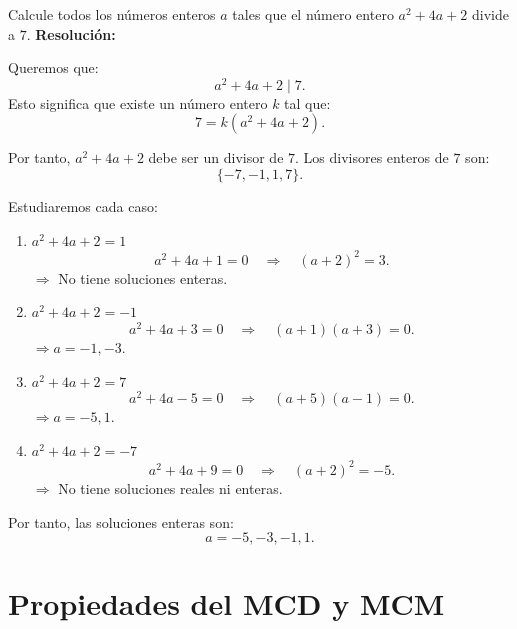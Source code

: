 \documentclass[a4paper,12pt]{article}
\begin{document}
\begin{ejercicio}[title=Ejercicio 15]
Calcule todos los números enteros $a$ tales que el número entero $a^2 + 4a + 2$ divide a $7$.
\tcblower
\textbf{Resolución:}

Queremos que:
\[
a^2 + 4a + 2 \mid 7.
\]
Esto significa que existe un número entero $k$ tal que:
\[
7 = k(a^2 + 4a + 2).
\]

Por tanto, $a^2 + 4a + 2$ debe ser un divisor de $7$. Los divisores enteros de $7$ son:
\[
\{-7, -1, 1, 7\}.
\]

Estudiaremos cada caso:

\begin{enumerate}
\item $a^2 + 4a + 2 = 1$
\[
a^2 + 4a + 1 = 0 \quad \Rightarrow \quad (a + 2)^2 = 3.
\]
$\Rightarrow$ No tiene soluciones enteras.

\item $a^2 + 4a + 2 = -1$
\[
a^2 + 4a + 3 = 0 \quad \Rightarrow \quad (a + 1)(a + 3) = 0.
\]
$\Rightarrow a = -1, -3.$

\item $a^2 + 4a + 2 = 7$
\[
a^2 + 4a - 5 = 0 \quad \Rightarrow \quad (a + 5)(a - 1) = 0.
\]
$\Rightarrow a = -5, 1.$

\item $a^2 + 4a + 2 = -7$
\[
a^2 + 4a + 9 = 0 \quad \Rightarrow \quad (a + 2)^2 = -5.
\]
$\Rightarrow$ No tiene soluciones reales ni enteras.
\end{enumerate}

\vspace{0.5em}
Por tanto, las soluciones enteras son:
\[
\boxed{a = -5, -3, -1, 1.}
\]
\end{ejercicio}

\section{Propiedades del MCD y MCM}
\end{document}
